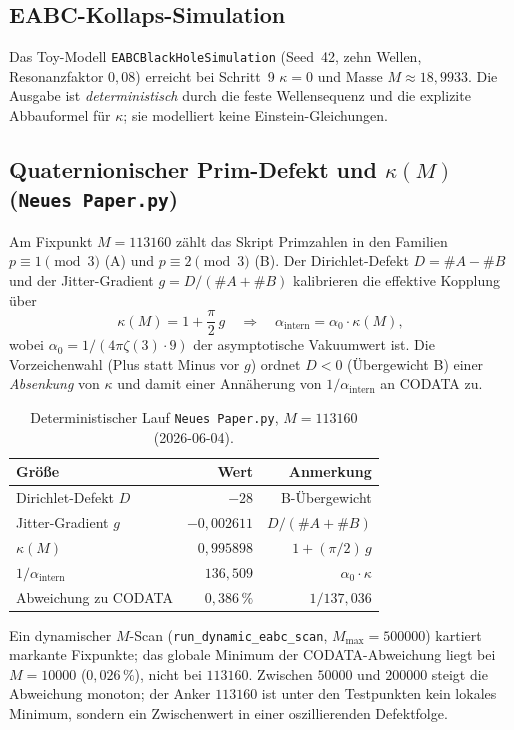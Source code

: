 \subsection{EABC-Kollaps-Simulation}

Das Toy-Modell \texttt{EABCBlackHoleSimulation} (Seed~42, zehn Wellen, Resonanzfaktor $0{,}08$) erreicht bei Schritt~9 $\kappa = 0$ und Masse $M \approx 18{,}9933$. Die Ausgabe ist \emph{deterministisch} durch die feste Wellensequenz und die explizite Abbauformel für $\kappa$; sie modelliert keine Einstein-Gleichungen.

\subsection{Quaternionischer Prim-Defekt und $\kappa(M)$ (\texttt{Neues Paper.py})}

Am Fixpunkt $M = 113160$ zählt das Skript Primzahlen in den Familien $p \equiv 1 \pmod 3$ (A) und $p \equiv 2 \pmod 3$ (B). Der Dirichlet-Defekt $D = \#A - \#B$ und der Jitter-Gradient $g = D/(\#A+\#B)$ kalibrieren die effektive Kopplung über
\[
  \kappa(M) = 1 + \frac{\pi}{2}\, g
  \quad\Longrightarrow\quad
  \alpha_{\mathrm{intern}} = \alpha_0 \cdot \kappa(M),
\]
wobei $\alpha_0 = 1/(4\pi\zeta(3)\cdot 9)$ der asymptotische Vakuumwert ist. Die Vorzeichenwahl (Plus statt Minus vor $g$) ordnet $D<0$ (Übergewicht B) einer \emph{Absenkung} von $\kappa$ und damit einer Annäherung von $1/\alpha_{\mathrm{intern}}$ an CODATA zu.

\begin{table}[ht]
  \centering
  \caption{Deterministischer Lauf \texttt{Neues Paper.py}, $M=113160$ (2026-06-04).}
  \label{tab:eabc-fixpunkt-m113160}
  \begin{tabular}{lrr}
    \hline
    Größe & Wert & Anmerkung \\
    \hline
    Dirichlet-Defekt $D$ & $-28$ & B-Übergewicht \\
    Jitter-Gradient $g$ & $-0{,}002611$ & $D/(\#A+\#B)$ \\
    $\kappa(M)$ & $0{,}995898$ & $1 + (\pi/2)\,g$ \\
    $1/\alpha_{\mathrm{intern}}$ & $136{,}509$ & $\alpha_0 \cdot \kappa$ \\
    Abweichung zu CODATA & $0{,}386\,\%$ & $1/137{,}036$ \\
    \hline
  \end{tabular}
\end{table}

Ein dynamischer $M$-Scan (\texttt{run\_dynamic\_eabc\_scan}, $M_{\max}=500000$) kartiert markante Fixpunkte; das globale Minimum der CODATA-Abweichung liegt bei $M=10000$ ($0{,}026\,\%$), nicht bei $113160$. Zwischen $50000$ und $200000$ steigt die Abweichung monoton; der Anker $113160$ ist unter den Testpunkten kein lokales Minimum, sondern ein Zwischenwert in einer oszillierenden Defektfolge.


